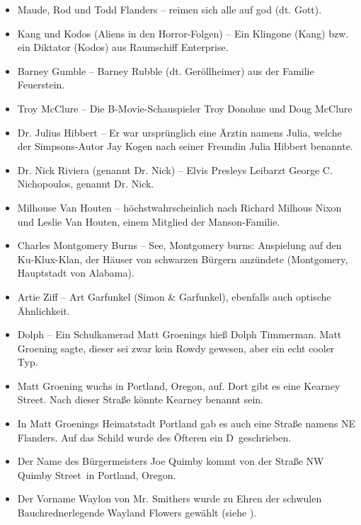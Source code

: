 \begin{itemize}
  \item Maude, Rod und Todd Flanders -- reimen sich alle auf god (dt. Gott).
  \item Kang und Kodos (Aliens in den Horror-Folgen) -- Ein Klingone (Kang) bzw. ein Diktator (Kodos) aus Raumschiff Enterprise.
  \item Barney Gumble -- Barney Rubble (dt. Ge\-röll\-hei\-mer) aus der Familie Feuerstein.
  \item Troy McClure -- Die B-Movie-Schauspieler Troy Donohue und Doug McClure
  \item Dr. Julius Hibbert -- Er war ursprünglich eine Ärztin namens Julia, welche der Simpsons-Autor Jay Kogen nach seiner Freundin Julia Hibbert benannte.
  \item Dr. Nick Riviera (genannt Dr. Nick) -- Elvis Presleys Leibarzt George C. Nichopoulos, genannt Dr. Nick.
  \item Milhouse Van Houten -- höchst\-wahr\-schein\-lich nach Richard Milhous Nixon und Leslie Van Houten, einem Mitglied der \glqq Manson\grqq -Familie.
  \item Charles Montgomery Burns -- \glqq See, Montgomery burns\grqq : Anspielung auf den Ku-Klux-Klan, der Häuser von schwarzen Bürgern anzündete (Montgomery, Hauptstadt von Alabama).
  \item Artie Ziff -- Art Garfunkel (Simon \& Garfunkel), ebenfalls auch optische Ähnlichkeit.
  \item Dolph -- Ein Schulkamerad Matt Groenings hieß Dolph Timmerman. Matt Groening sagte, dieser sei zwar kein Rowdy gewesen, aber ein \glqq echt cooler Typ\grqq .
  \item Matt Groening wuchs in Portland, Oregon, auf. Dort gibt es eine \glqq Kearney Street\grqq . Nach dieser Straße könnte Kearney benannt sein.
  \item In Matt Groenings Heimatstadt Portland gab es auch eine Straße namens \glqq NE Flanders\grqq . Auf das Schild wurde des Öfteren ein \glqq D\grqq\ geschrieben.
  \item Der Name des Bürgermeisters Joe Quimby kommt von der Straße \glqq NW Quimby Street\grqq\ in Portland, Oregon.
  \item Der Vorname Waylon von Mr. Smithers wurde zu Ehren der schwulen Bauchrednerlegende Wayland Flowers gewählt (siehe \cite{Reiss19}).
\end{itemize}